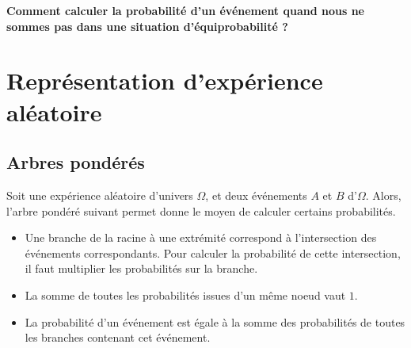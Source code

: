 \documentclass{article}
\begin{document}
\vspace*{0.5cm}
\begin{tcolorbox}
\begin{center}
\textbf{Comment calculer la probabilité d'un événement quand nous ne sommes pas dans une situation d'équiprobabilité ?}
\end{center}
\end{tcolorbox}
\newpage
\section{Représentation d'expérience aléatoire}
\subsection{Arbres pondérés}
\begin{example}
Soit une expérience aléatoire d'univers $\Omega$, et deux événements $A$ et $B$ d'$\Omega$. Alors, l'arbre pondéré suivant permet donne le moyen de calculer certains probabilités.
\begin{center}
\end{center}
\end{example}
\begin{tcolorbox}
\begin{proposition}
\hfill
\begin{itemize}
\item Une branche de la racine à une extrémité correspond à l'intersection des événements correspondants. Pour calculer la probabilité de cette intersection, il faut multiplier les probabilités sur la branche.
\item La somme de toutes les probabilités issues d'un même noeud vaut $1$.
\item La probabilité d'un événement est égale à la somme des probabilités de toutes les branches contenant cet événement. 
\end{itemize}        
\end{proposition}
\end{tcolorbox}
\end{document}
